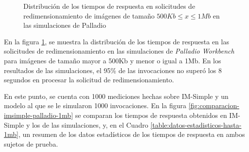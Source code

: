 \hspace{-3.0cm}
\begin{figure}
\caption{Distribución de los tiempos de respuesta en solicitudes de redimensionamiento de imágenes de tamaño $500Kb \leq x \leq 1Mb$ en las simulaciones de Palladio}
\label{fig:distribucion-simulacion-imagenes-hasta-1mb}
\end{figure}

En la figura \ref{fig:distribucion-simulacion-imagenes-hasta-1mb}, se muestra la distribución de los tiempos de respuesta en las solicitudes de redimensionamiento en las simulaciones de \emph{Palladio Workbench} para imágenes de tamaño mayor a 500Kb y menor o igual a 1Mb. En los resultados de las simulaciones, el 95\% de las invocaciones no superó los 8 segundos en procesar la solicitud de redimensionamiento.

En este punto, se cuenta con 1000 mediciones hechas sobre IM-Simple y un modelo al que se le simularon 1000 invocaciones. En la figura \ref{fig:comparacion-imsimple-palladio-1mb} se comparan los tiempos de respuesta obtenidos en IM-Simple y los de las simulaciones, y, en el Cuadro \ref{table:datos-estadisticos-hasta-1mb}, un resumen de los datos estadísticos de los tiempos de respuesta en ambos sujetos de prueba.


